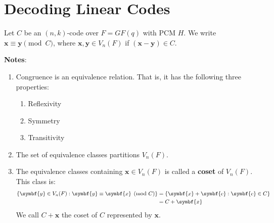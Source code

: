 \section{Decoding Linear Codes}

\begin{Definition}{}{}
    Let $ C $ be an $ (n,k) $-code over $ F=GF(q) $ with PCM $ H $.
    We write $ \symbf{x}\equiv \symbf{y} \pmod{C} $, where $ \symbf{x},\symbf{y}\in V_n(F) $
    if $ (\symbf{x}-\symbf{y})\in C $.
\end{Definition}

\textbf{Notes}:
\begin{enumerate}[label=(\arabic*)]
    \item Congruence is an equivalence relation. That is, it has the
          following three properties:
          \begin{enumerate}[label=(\roman*)]
              \item Reflexivity
              \item Symmetry
              \item Transitivity
          \end{enumerate}
    \item The set of equivalence classes partitions $ V_n(F) $.
    \item The equivalence classes containing $ \symbf{x}\in V_n(F) $
          is called a \textbf{coset} of $ V_n(F) $. This class is:
          \begin{align*}
              \set{\symbf{y}\in V_n(F):\symbf{y}\equiv \symbf{x}\pmod{C}}
               & =\set{\symbf{x}+\symbf{c}:\symbf{c}\in C} \\
               & =C+\symbf{x}
          \end{align*}
          We call $ C+\symbf{x} $ the coset of $ C $ represented by $ \symbf{x} $.
\end{enumerate}

